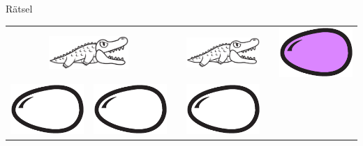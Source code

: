 \begin{frame}{Rätsel}
	\begin{center}
		\begin{tabular}{cccccc}
			\multicolumn{2}{c}{
				\includegraphics[height=1.25cm]{media/alligator_blank}
			}
			& &
			\includegraphics[height=1.25cm]{media/alligator_blank}
			& &
			\includegraphics[height=.75cm]{media/egg_pink}
			\\
			\includegraphics[height=.75cm]{media/egg_blank}
			&
			\includegraphics[height=.75cm]{media/egg_blank}
			& &
			\includegraphics[height=.75cm]{media/egg_blank}
		\end{tabular}
	\end{center}
\end{frame}

